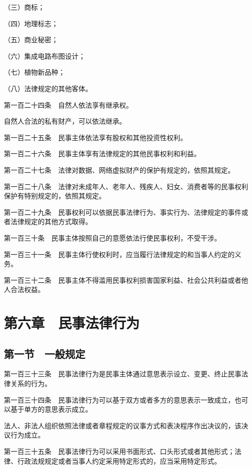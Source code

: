 \documentclass[UTF8,12pt,a4paper]{ctexbook}
\begin{document}
（三）商标；

（四）地理标志；

（五）商业秘密；

（六）集成电路布图设计；

（七）植物新品种；

（八）法律规定的其他客体。

第一百二十四条　自然人依法享有继承权。

自然人合法的私有财产，可以依法继承。

第一百二十五条　民事主体依法享有股权和其他投资性权利。

第一百二十六条　民事主体享有法律规定的其他民事权利和利益。

第一百二十七条　法律对数据、网络虚拟财产的保护有规定的，依照其规定。

第一百二十八条　法律对未成年人、老年人、残疾人、妇女、消费者等的民事权利保护有特别规定的，依照其规定。

第一百二十九条　民事权利可以依据民事法律行为、事实行为、法律规定的事件或者法律规定的其他方式取得。

第一百三十条　民事主体按照自己的意愿依法行使民事权利，不受干涉。

第一百三十一条　民事主体行使权利时，应当履行法律规定的和当事人约定的义务。

第一百三十二条　民事主体不得滥用民事权利损害国家利益、社会公共利益或者他人合法权益。

\section*{第六章　民事法律行为}

\subsection*{第一节　一般规定}

第一百三十三条　民事法律行为是民事主体通过意思表示设立、变更、终止民事法律关系的行为。

第一百三十四条　民事法律行为可以基于双方或者多方的意思表示一致成立，也可以基于单方的意思表示成立。

法人、非法人组织依照法律或者章程规定的议事方式和表决程序作出决议的，该决议行为成立。

第一百三十五条　民事法律行为可以采用书面形式、口头形式或者其他形式；法律、行政法规规定或者当事人约定采用特定形式的，应当采用特定形式。
\end{document}
